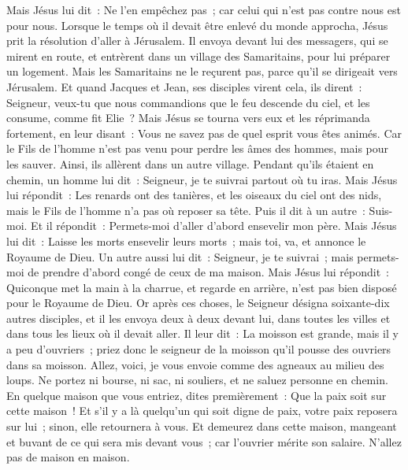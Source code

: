 \begin{multicols}{2}
Mais Jésus lui dit~: Ne l'en empêchez pas~; car celui qui n'est pas contre nous est pour nous.
Lorsque le temps où il devait être enlevé du monde approcha, Jésus prit la résolution d'aller à Jérusalem.
Il envoya devant lui des messagers, qui se mirent en route, et entrèrent dans un village des Samaritains, pour lui préparer un logement.
Mais les Samaritains ne le reçurent pas, parce qu'il se dirigeait vers Jérusalem.
Et quand Jacques et Jean, ses disciples virent cela, ils dirent~: Seigneur, veux-tu que nous commandions que le feu descende du ciel, et les consume, comme fit Elie~?
Mais Jésus se tourna vers eux et les réprimanda fortement, en leur disant~: Vous ne savez pas de quel esprit vous êtes animés.
Car le Fils de l'homme n'est pas venu pour perdre les âmes des hommes, mais pour les sauver. Ainsi, ils allèrent dans un autre village.
Pendant qu'ils étaient en chemin, un homme lui dit~: Seigneur, je te suivrai partout où tu iras.
Mais Jésus lui répondit~: Les renards ont des tanières, et les oiseaux du ciel ont des nids, mais le Fils de l'homme n'a pas où reposer sa tête.
Puis il dit à un autre~: Suis-moi. Et il répondit~: Permets-moi d'aller d'abord ensevelir mon père.
Mais Jésus lui dit~: Laisse les morts ensevelir leurs morts~; mais toi, va, et annonce le Royaume de Dieu.
Un autre aussi lui dit~: Seigneur, je te suivrai~; mais permets-moi de prendre d'abord congé de ceux de ma maison.
Mais Jésus lui répondit~: Quiconque met la main à la charrue, et regarde en arrière, n'est pas bien disposé pour le Royaume de Dieu.
\VerseOne{}Or après ces choses, le Seigneur désigna soixante-dix autres disciples, et il les envoya deux à deux devant lui, dans toutes les villes et dans tous les lieux où il devait aller.
Il leur dit~: La moisson est grande, mais il y a peu d'ouvriers~; priez donc le seigneur de la moisson qu'il pousse des ouvriers dans sa moisson.
Allez, voici, je vous envoie comme des agneaux au milieu des loups.
Ne portez ni bourse, ni sac, ni souliers, et ne saluez personne en chemin.
En quelque maison que vous entriez, dites premièrement~: Que la paix soit sur cette maison~!
Et s'il y a là quelqu'un qui soit digne de paix, votre paix reposera sur lui~; sinon, elle retournera à vous.
Et demeurez dans cette maison, mangeant et buvant de ce qui sera mis devant vous~; car l'ouvrier mérite son salaire. N'allez pas de maison en maison.

\end{multicols}
